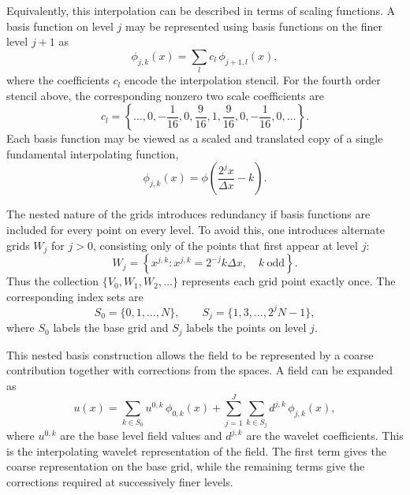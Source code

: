 Equivalently, this interpolation can be described in terms of scaling functions. A basis function on level $j$ may be represented using basis functions on the finer level $j+1$ as
\begin{equation}
    \phi_{j,k}(x)
    =
    \sum_l c_l\,\phi_{j+1,l}(x),
\end{equation}
where the coefficients $c_l$ encode the interpolation stencil. For the fourth order stencil above, the corresponding nonzero two scale coefficients are
\begin{equation}
    c_l
    =
    \left\{
        \ldots,
        0,
        -\frac{1}{16},
        0,
        \frac{9}{16},
        1,
        \frac{9}{16},
        0,
        -\frac{1}{16},
        0,
        \ldots
    \right\}.
\end{equation}
Each basis function may be viewed as a scaled and translated copy of a single fundamental interpolating function,
\begin{equation}
    \phi_{j,k}(x)
    =
    \phi\!\left(\frac{2^j x}{\Delta x} - k\right).
\end{equation}

The nested nature of the grids introduces redundancy if basis functions are included for every point on every level. To avoid this, one introduces alternate grids $W_j$ for $j>0$, consisting only of the points that first appear at level $j$:
\begin{equation}
    W_j
    =
    \left\{
        x^{j,k} : x^{j,k}=2^{-j}k\Delta x,
        \quad k \ \mathrm{odd}
    \right\}.
\end{equation}
Thus the collection $\{V_0,W_1,W_2,\ldots\}$ represents each grid point exactly once. The corresponding index sets are
\begin{equation}
    S_0 = \{0,1,\ldots,N\},
    \qquad
    S_j = \{1,3,\ldots,2^jN-1\},
\end{equation}
where $S_0$ labels the base grid and $S_j$ labels the points on level $j$.

This nested basis construction allows the field to be represented by a coarse contribution together with corrections from the spaces. A field can be expanded as
\begin{equation}
    u(x)
    =
    \sum_{k \in S_0}
    u^{0,k}\,\phi_{0,k}(x)
    +
    \sum_{j=1}^{J}
    \sum_{k \in S_j}
    d^{j,k}\,\phi_{j,k}(x),
\end{equation}
where $u^{0,k}$ are the base level field values and $d^{j,k}$ are the wavelet coefficients. This is the interpolating wavelet representation of the field. The first term gives the coarse representation on the base grid, while the remaining terms give the corrections required at successively finer levels.

